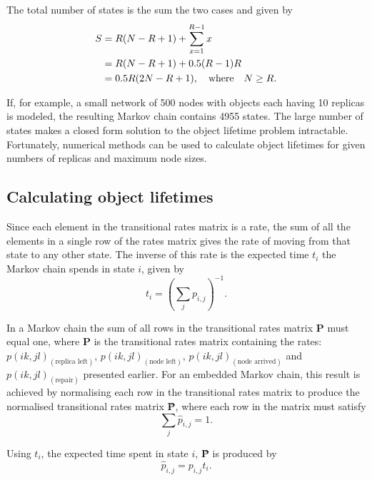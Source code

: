 \documentclass[10pt,a4paper,conference]{IEEEtran}
\begin{document}
The total number of states is the sum the two cases and given by
%
\begin{align}
       S & = R(N - R + 1) + \sum_{x=1}^{R-1} x\label{eq_states_num_init}\\
         & = R(N - R + 1) + 0.5 (R - 1) R\notag\\
         & = 0.5 R (2 N - R + 1), \quad\textrm{where}\quad N \geq R. \label{eq_states_num_ans}
\end{align}

If, for example, a small network of 500 nodes with objects each having 10 replicas is modeled, the resulting Markov chain contains 4955 states. The large number of states makes a closed form solution to the object lifetime problem intractable. Fortunately, numerical methods can be used to calculate object lifetimes for given numbers of replicas and maximum node sizes.

\subsection{Calculating object lifetimes}

Since each element in the transitional rates matrix is a rate, the sum of all the elements in a single row of the rates matrix gives the rate of moving from that state to any other state. The inverse of this rate is the expected time $t_i$ the Markov chain spends in state $i$, given by
%
\begin{equation} \label{eq_markov_rates}
    t_i = \left(\sum_{j} p_{i, j}\right)^{-1}.
\end{equation}

In a Markov chain the sum of all rows in the transitional rates matrix \textbf{P} must equal one, where \textbf{P} is the transitional rates matrix containing the rates: $p(i k,j l)_{(\textrm{replica left})}$, $p(i k,j l)_{(\textrm{node left})}$, $p(i k,j l)_{(\textrm{node arrived})}$ and $p(i k,j l)_{(\textrm{repair})}$ presented earlier. For an embedded Markov chain, this result is achieved by normalising each row in the transitional rates matrix to produce the normalised transitional rates matrix \textbf{\^{P}}, where each row in the matrix must satisfy
%
\begin{equation} \label{eq_markov_sum}
    \sum_{j} \hat{p}_{i, j} = 1.
\end{equation}

Using $t_i$, the expected time spent in state $i$, \textbf{\^{P}} is produced by
%
\begin{equation} \label{eq_markov_normalisation}
    \hat{p}_{i, j} = p_{i, j} t_i.
\end{equation}
\end{document}
